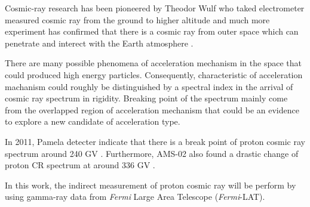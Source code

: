 \par Cosmic-ray research has been pioneered by Theodor Wulf who taked electrometer measured cosmic ray from the ground to higher altitude and much more experiment has confirmed that there is a cosmic ray from outer space which can penetrate and interect with the Earth atmosphere \cite{HESS,Pacini,Clay}.

\par There are many possible phenomena of acceleration mechanism in the
space that could produced high energy particles. Consequently, characteristic of acceleration machanism could roughly be distinguished by a spectral index in the arrival of cosmic ray spectrum in rigidity.
Breaking point of the spectrum mainly come from the overlapped region of acceleration mechanism that could be an evidence to explore a new candidate of acceleration type.

In 2011, Pamela detecter indicate that there is a break point of proton cosmic ray spectrum around 240 GV \cite{PAMELA}.
Furthermore, AMS-02 also found a drastic change of proton CR spectrum at around 336 GV \cite{AMS-02}.

\par In this work, the indirect measurement of proton cosmic ray will be perform by using gamma-ray data from \textit{Fermi} Large Area Telescope (\textit{Fermi}-LAT).